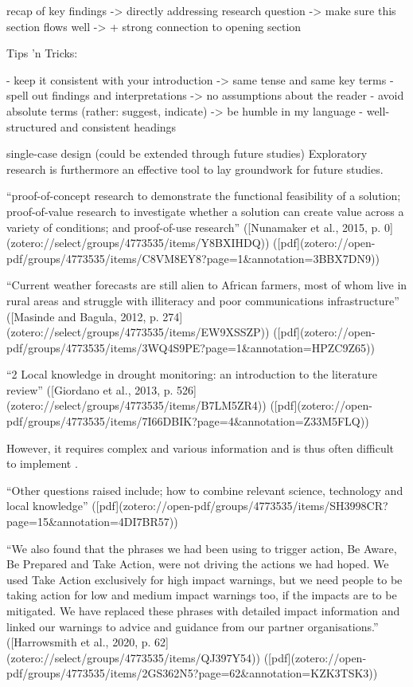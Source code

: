 recap of key findings -> directly addressing research question
-> make sure this section flows well -> + strong connection to opening section

Tips 'n Tricks:

- keep it consistent with your introduction -> same tense and same key terms
- spell out findings and interpretations -> no assumptions about the reader
- avoid absolute terms (rather: suggest, indicate) -> be humble in my language
- well-structured and consistent headings





single-case design (could be extended through future studies)
Exploratory research is furthermore an effective tool to lay groundwork for future studies.

“proof-of-concept research to demonstrate the functional feasibility of a solution; proof-of-value research to investigate whether a solution can create value across a variety of conditions; and proof-of-use research” ([Nunamaker et al., 2015, p. 0](zotero://select/groups/4773535/items/Y8BXIHDQ)) ([pdf](zotero://open-pdf/groups/4773535/items/C8VM8EY8?page=1&annotation=3BBX7DN9))


“Current weather forecasts are still alien to African farmers, most of whom live in rural areas and struggle with illiteracy and poor communications infrastructure” ([Masinde and Bagula, 2012, p. 274](zotero://select/groups/4773535/items/EW9XSSZP)) ([pdf](zotero://open-pdf/groups/4773535/items/3WQ4S9PE?page=1&annotation=HPZC9Z65))


“2 Local knowledge in drought monitoring: an introduction to the literature review” ([Giordano et al., 2013, p. 526](zotero://select/groups/4773535/items/B7LM5ZR4)) ([pdf](zotero://open-pdf/groups/4773535/items/7I66DBIK?page=4&annotation=Z33M5FLQ))

However, it requires complex and various information and is thus often difficult to implement \autocite{liuWaterScarcityAssessments2017}.


“Other questions raised include; how to combine relevant science, technology and local knowledge” ([pdf](zotero://open-pdf/groups/4773535/items/SH3998CR?page=15&annotation=4DI7BR57))

“We also found that the phrases we had been using to trigger action, Be Aware, Be Prepared and Take Action, were not driving the actions we had hoped. We used Take Action exclusively for high impact warnings, but we need people to be taking action for low and medium impact warnings too, if the impacts are to be mitigated. We have replaced these phrases with detailed impact information and linked our warnings to advice and guidance from our partner organisations.” ([Harrowsmith et al., 2020, p. 62](zotero://select/groups/4773535/items/QJ397Y54)) ([pdf](zotero://open-pdf/groups/4773535/items/2GS362N5?page=62&annotation=KZK3TSK3))

